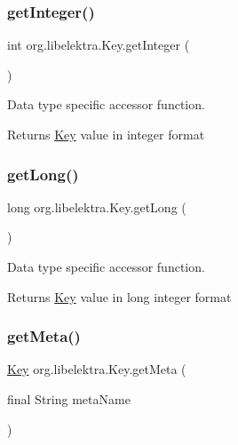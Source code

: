 \subsubsection{\texorpdfstring{get\+Integer()}{getInteger()}}
{\footnotesize\ttfamily int org.\+libelektra.\+Key.\+get\+Integer (\begin{DoxyParamCaption}{ }\end{DoxyParamCaption})\hspace{0.3cm}{\ttfamily [inline]}}



Data type specific accessor function. 

\begin{DoxyReturn}{Returns}
\hyperlink{classorg_1_1libelektra_1_1Key}{Key} value in integer format 
\end{DoxyReturn}
\mbox{\label{classorg_1_1libelektra_1_1Key_a545c7042ebb95d4b8ad45658ebb8ec85}} 
\subsubsection{\texorpdfstring{get\+Long()}{getLong()}}
{\footnotesize\ttfamily long org.\+libelektra.\+Key.\+get\+Long (\begin{DoxyParamCaption}{ }\end{DoxyParamCaption})\hspace{0.3cm}{\ttfamily [inline]}}



Data type specific accessor function. 

\begin{DoxyReturn}{Returns}
\hyperlink{classorg_1_1libelektra_1_1Key}{Key} value in long integer format 
\end{DoxyReturn}
\mbox{\label{classorg_1_1libelektra_1_1Key_a49d5d04f67917075c7b1513249777ccf}} 
\subsubsection{\texorpdfstring{get\+Meta()}{getMeta()}}
{\footnotesize\ttfamily \hyperlink{classorg_1_1libelektra_1_1Key}{Key} org.\+libelektra.\+Key.\+get\+Meta (\begin{DoxyParamCaption}\item[{final String}]{meta\+Name }\end{DoxyParamCaption})\hspace{0.3cm}{\ttfamily [inline]}}



